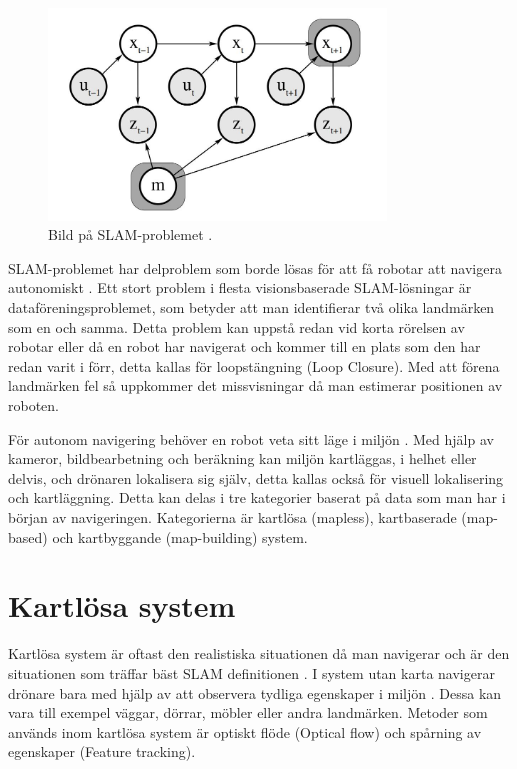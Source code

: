 \begin{figure}[ht]
    \begin{center}
    \includegraphics[width=0.8\textwidth]{online-slam.JPG}
    \caption{Bild på SLAM-problemet \citep{ProbabilisticRobotics}.}
    \label{slam-problemet}
    \end{center}
\end{figure}

SLAM-problemet har delproblem som borde lösas för att få robotar att navigera autonomiskt \citep{slamproblem}. Ett stort problem i flesta visionsbaserade SLAM-lösningar är dataföreningsproblemet, som betyder att man identifierar två olika landmärken som en och samma. Detta problem kan uppstå redan vid korta rörelsen av robotar eller då en robot har navigerat och kommer till en plats som den har redan varit i förr, detta kallas för loopstängning (Loop Closure). Med att förena landmärken fel så uppkommer det missvisningar då man estimerar positionen av roboten.

För autonom navigering behöver en robot veta sitt läge i miljön \citep{geospatial}. Med hjälp av kameror, bildbearbetning och beräkning kan miljön kartläggas, i helhet eller delvis, och drönaren lokalisera sig själv, detta kallas också för visuell lokalisering och kartläggning. Detta kan delas i tre kategorier baserat på data som man har i början av navigeringen. Kategorierna är kartlösa (mapless), kartbaserade (map-based) och kartbyggande (map-building) system. 

\section{Kartlösa system}

Kartlösa system är oftast den realistiska situationen då man navigerar och är den situationen som träffar bäst SLAM definitionen \citep{ProbabilisticRobotics}. I system utan karta navigerar drönare bara med hjälp av att observera tydliga egenskaper i miljön \citep{982903}. Dessa kan vara till exempel väggar, dörrar, möbler eller andra landmärken. Metoder som används inom kartlösa system är optiskt flöde (Optical flow) och spårning av egenskaper (Feature tracking). 

